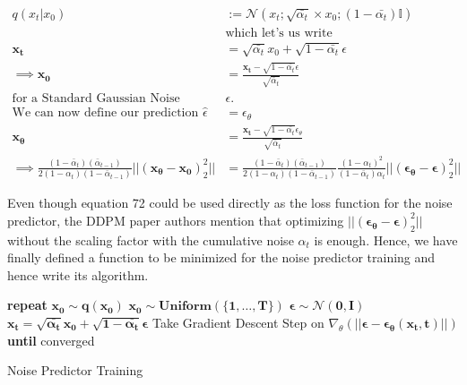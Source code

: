 \documentclass{article}
\begin{document}
\begin{align}
	q(x_t|x_0) &:= \mathcal{N}(x_{t}; \sqrt{\bar{\alpha_t}} \times x_0; (1 - \bar{\alpha_t})\mathbb{I}) \\
	&\text{which  let's us write } \\
	\mathbf{x_t} &= \sqrt{\bar{\alpha_t}}  x_0 +  \sqrt{1 - \bar{\alpha_t}}\epsilon \\
	\implies \mathbf{x_0} &= \frac{\mathbf{x_t} -  \sqrt{1-\bar{\alpha_t}}\epsilon}{\sqrt{\bar\alpha_t}}\\
	\text{for a Standard Gaussian Noise  } &\epsilon. \\
	\text{We can now define our prediction   } \hat\epsilon& = \epsilon_\theta\\
	\mathbf{x_\theta}  &= \frac{\mathbf{x_t} -  \sqrt{1-\bar{\alpha_t}}\epsilon_\theta}{\sqrt{\bar\alpha_t}} \\
	\implies 
	\frac{(1- \bar{\alpha}_t)(\bar\alpha_{t-1}) }{2(1-\alpha_t)(1- \bar\alpha_{t-1})}\big|\big| (\mathbf{x_\theta - x_0})^2_2 \big|\big| &= 	\frac{(1- \bar{\alpha}_t)(\bar\alpha_{t-1}) }{2(1-\alpha_t)(1- \bar\alpha_{t-1})} \frac{(1-\alpha_t)^2}{(1-\bar\alpha_t)\alpha_t}\big|\big| (\mathbf{\epsilon_\theta- \epsilon})^2_2 \big|\big|
\end{align}

Even though equation 72 could be used directly as the loss function for the noise predictor, the DDPM paper authors mention that optimizing $\big|\big| (\mathbf{\epsilon_\theta- \epsilon})^2_2 \big|\big|$ without the scaling factor with the cumulative noise $\alpha_t$ is enough. Hence, we have finally defined a function to be minimized for the noise predictor training and hence write its algorithm.

\begin{algorithm} 
	\begin{algorithmic}[1]
		\State \textbf{repeat}
		\State $\mathbf{x_0 \sim q(x_0)}$ 
		\State $\mathbf{x_0 \sim Uniform(\{1, \hdots, T\})}$ 
		\State $\mathbf{\epsilon \sim \mathcal{N}(0, I)}$ 
		\State $\mathbf{x_t = \sqrt{\bar{\alpha_t}}  x_0 +  \sqrt{1 - \bar{\alpha_t}}\epsilon }$ 
		\State Take Gradient Descent Step on  $\nabla_\theta(\mathbf{|| \epsilon - \epsilon_\theta(x_t, t)|| })$
		\State \textbf{until} converged
	\end{algorithmic} 
	\caption{Noise Predictor Training}
	\label{alg:algorithm1}
\end{algorithm}
\end{document}
